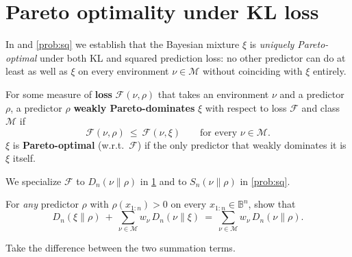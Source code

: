 \documentclass[fontsize=11pt, parskip=half]{scrartcl}
\newcommand{\Mc}{\mathcal{M}}
\newcommand{\Sn}[2]{S_{n}(#1 \parallel #2)}
\begin{document}
\section{Pareto optimality under KL loss}\label{prob:kl}

In  and \cref{prob:sq} we establish that the Bayesian mixture $\xi$ is
\emph{uniquely Pareto-optimal} under both KL and squared prediction loss:
no other predictor can do at least as well as $\xi$ on every environment
$\nu \in \Mc$ without coinciding with $\xi$ entirely. 


\begin{definition}\label{def:pareto}
For some measure of \textbf{loss} $\mathcal F(\nu, \rho)$ that takes an environment $\nu$ and a
predictor $\rho$, a predictor $\rho$ \textbf{weakly Pareto-dominates} $\xi$  with respect to 
loss $\mathcal{F}$ and class $\mathcal{M}$ if
\[
  \mathcal F(\nu, \rho) ~\leq~ \mathcal F(\nu, \xi)
  \qquad \text{for every } \nu \in \Mc.
\]
$\xi$ is \textbf{Pareto-optimal} (w.r.t.\ $\mathcal F$) if the only predictor
that weakly dominates it is $\xi$ itself.

We specialize $\mathcal F$ to $D_n(\nu \parallel \rho)$ in \cref{prob:kl} 
and to $\Sn{\nu}{\rho}$ in \cref{prob:sq}.
\end{definition}


\begin{exercise}
\label{prob:kl_pythag}



For \emph{any} predictor $\rho$ with $\rho(x_{1:n}) > 0$ on every $x_{1:n} \in \mathbb{B}^n$, show that
\[
  D_n(\xi \parallel \rho) ~+~ \sum_{\nu \in \Mc} w_\nu \, D_n(\nu \parallel \xi)
  ~=~ \sum_{\nu \in \Mc} w_\nu \, D_n(\nu \parallel \rho).
\]


\begin{hint}
Take the difference between the two summation terms.
\end{hint}
\end{exercise}
\end{document}
